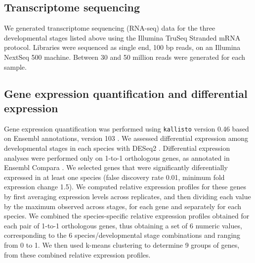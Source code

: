 \subsection*{Transcriptome sequencing}
We generated transcriptome sequencing (RNA-seq) data for the three developmental stages listed above using the Illumina TruSeq Stranded mRNA protocol. Libraries were sequenced as single end, 100 bp reads, on an Illumina NextSeq 500 machine. Between 30 and 50 million reads were generated for each sample.


\subsection*{Gene expression quantification and differential expression}
Gene expression quantification was performed using \texttt{kallisto} version 0.46 \citep{bray_near-optimal_2016} based on Ensembl annotations, version 103 \citep{cunningham_ensembl_2019}. We assessed differential expression among developmental stages in each species with DESeq2 \citep{love_moderated_2014}. Differential expression analyses were performed only on 1-to-1 orthologous genes, as annotated in Ensembl Compara \citep{cunningham_ensembl_2019}. We selected genes that were significantly diferentially expressed in at least one species (false discovery rate 0.01, minimum fold expression change 1.5). We computed relative expression profiles for these genes by first averaging expression levels across replicates, and then dividing each value by the maximum observed across stages, for each gene and separately for each species. We combined the species-specific relative expression profiles obtained for each pair of 1-to-1 orthologous genes, thus obtaining a set of 6 numeric values, corresponding to the 6 species/developmental stage combinations and ranging from 0 to 1. We then used k-means clustering to determine 9 groups of genes, from these combined relative expression profiles. 

